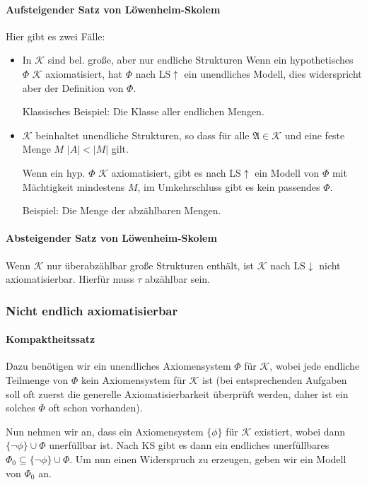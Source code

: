 \documentclass{panikzettel}
\newcommand{\A}{\mathfrak{A}}
\newcommand{\K}{\mathcal{K}}
\begin{document}
	\paragraph{Aufsteigender Satz von Löwenheim-Skolem} Hier gibt es zwei Fälle:
	\begin{itemize}
		\item In $\K$ sind bel. große, aber nur endliche Strukturen
		Wenn ein hypothetisches $\Phi$ $\K$ axiomatisiert, hat $\Phi$ nach LS$\uparrow$ ein unendliches Modell, dies widerspricht aber der Definition von $\Phi$.
		
		Klassisches Beispiel: Die Klasse aller endlichen Mengen.
		
		\item $\K$ beinhaltet unendliche Strukturen, so dass für alle $\A \in \K$ und eine feste Menge $M$ $\lvert A \rvert < \lvert M \rvert$ gilt.
		 
		Wenn ein hyp. $\Phi$ $\K$ axiomatisiert, gibt es nach LS$\uparrow$ ein Modell von $\Phi$ mit Mächtigkeit mindestens $M$, im Umkehrschluss gibt es kein passendes $\Phi$.
		
		Beispiel: Die Menge der abzählbaren Mengen.
	\end{itemize}
	\paragraph{Absteigender Satz von Löwenheim-Skolem} Wenn $\K$ nur überabzählbar große Strukturen enthält, ist $\K$ nach LS$\downarrow$ nicht axiomatisierbar. Hierfür muss $\tau$ abzählbar sein.

\subsubsection{Nicht endlich axiomatisierbar}

	\paragraph{Kompaktheitssatz} Dazu benötigen wir ein unendliches Axiomensystem $\Phi$ für $\K$, wobei jede endliche Teilmenge von $\Phi$ kein Axiomensystem für $\K$ ist (bei entsprechenden Aufgaben soll oft zuerst die generelle Axiomatisierbarkeit überprüft werden, daher ist ein solches $\Phi$ oft schon vorhanden).
	
	Nun nehmen wir an, dass ein Axiomensystem $\{\phi\}$ für $\K$ existiert, wobei dann $\{\lnot\phi\} \cup \Phi$ unerfüllbar ist.
	Nach KS gibt es dann ein endliches unerfüllbares $\Phi_0 \subseteq \{\lnot\phi\} \cup \Phi$. Um nun einen Widerspruch zu erzeugen, geben wir ein Modell von $\Phi_0$ an.
	
\end{document}

